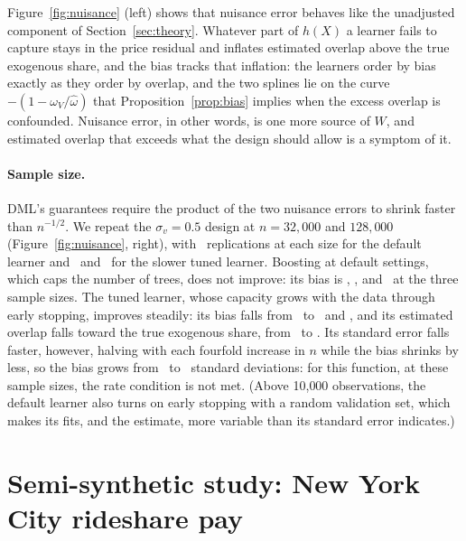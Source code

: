\documentclass[11pt]{article}
\theoremstyle{remark}
\begin{document}
Figure~\ref{fig:nuisance} (left) shows that nuisance error behaves like the unadjusted component of Section~\ref{sec:theory}. Whatever part of $h(X)$ a learner fails to capture stays in the price residual and inflates estimated overlap above the true exogenous share, and the bias tracks that inflation: the learners order by bias exactly as they order by overlap, and the two splines lie on the curve $-(1 - \omega_V / \hat\omega)$ that Proposition~\ref{prop:bias} implies when the excess overlap is confounded. Nuisance error, in other words, is one more source of $W$, and estimated overlap that exceeds what the design should allow is a symptom of it.

\paragraph{Sample size.} DML's guarantees require the product of the two nuisance errors to shrink faster than $n^{-1/2}$. We repeat the $\sigma_v = 0.5$ design at $n = 32{,}000$ and $128{,}000$ (Figure~\ref{fig:nuisance}, right), with \SfourDefRepsThirtyTwo\ replications at each size for the default learner and \SfourTunedRepsThirtyTwo\ and \SfourTunedRepsOneTwentyEight\ for the slower tuned learner. Boosting at default settings, which caps the number of trees, does not improve: its bias is \SfourDefBiasEight, \SfourDefBiasThirtyTwo, and \SfourDefBiasOneTwentyEight\ at the three sample sizes. The tuned learner, whose capacity grows with the data through early stopping, improves steadily: its bias falls from \SfourTunedBiasEight\ to \SfourTunedBiasThirtyTwo\ and \SfourTunedBiasOneTwentyEight, and its estimated overlap falls toward the true exogenous share, from \SfourTunedOvEight\ to \SfourTunedOvOneTwentyEight. Its standard error falls faster, however, halving with each fourfold increase in $n$ while the bias shrinks by less, so the bias grows from \SfourTunedBiasSDEight\ to \SfourTunedBiasSDOneTwentyEight\ standard deviations: for this function, at these sample sizes, the rate condition is not met. (Above 10{,}000 observations, the default learner also turns on early stopping with a random validation set, which makes its fits, and the estimate, more variable than its standard error indicates.)

\section{Semi-synthetic study: New York City rideshare pay}
\label{sec:app}
\end{document}
